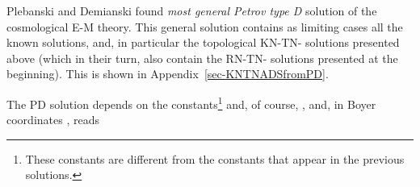 \documentclass[12pt,a4paper]{article}
\begin{document}
Plebanski and Demianski found {\it most general Petrov type D}
solution of the cosmological E-M theory. This general solution
contains as limiting cases all the known solutions, and, in particular
the topological KN-TN-\coordHE{} solutions presented above (which in their
turn, also contain the RN-TN-\coordHE{} solutions presented at the
beginning). This is shown in Appendix~\ref{sec-KNTNADSfromPD}.

The PD solution depends on the constants\footnote{These constants are
  different from the constants \coordHE{} that appear in the previous
  solutions.}
\coordHE{} and,
of course, \coordHE{}, and, in Boyer coordinates \coordHE{}, reads
\cite{art:PD}

%

%
\end{document}
